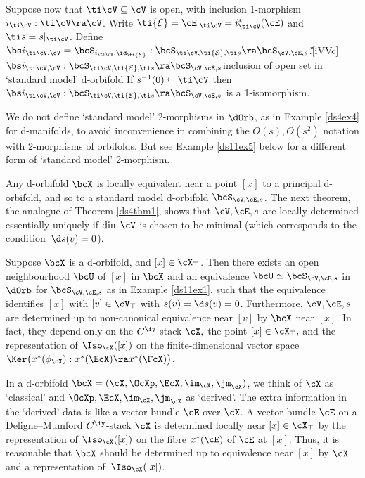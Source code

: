 \documentclass{article}
\begin{document}
\begin{ex}
Suppose now that $\ti\cV\subseteq\cV$ is open, with inclusion
1-morphism $i_{\smash{\ti\cV}}:\ti\cV\ra\cV$. Write $\ti{\cal
E}=\cE\vert_{\smash{\ti\cV}}= i_{\smash{\ti\cV}}^*(\cE)$ and $\ti
s=s\vert_{\smash{\ti\cV}}$. Define $\bs
i_{\smash{\ti\cV,\cV}}=\bcS_{i_{\smash{\ti\cV}},\id_{\ti{\cal E}}}:
\bcS_{\smash{\ti\cV,\ti{\cal E},\ti
s}}\ra\bcS_{\cV,\cE,s}$.\G[iVVc]{$\bs
i_{\smash{\ti\cV,\cV}}:\bcS_{\smash{\ti\cV,\ti{\cal E},\ti
s}}\ra\bcS_{\cV,\cE,s}$}{inclusion of open set in `standard model'
d-orbifold} If $s^{-1}(0)\subseteq\ti\cV$ then $\bs
i_{\smash{\ti\cV,\cV}}:\bcS_{\smash{\ti\cV,\ti{\cal E},\ti
s}}\ra\bcS_{\cV,\cE,s}$ is a 1-isomorphism.
\label{ds11ex2}
\end{ex}

We do not define `standard model' 2-morphisms in $\dOrb$, as in
Example \ref{ds4ex4} for d-manifolds, to avoid inconvenience in
combining the $O(s),O(s^2)$ notation with 2-morphisms of orbifolds.
But see Example \ref{ds11ex5} below for a different form of
`standard model' 2-morphism.

Any d-orbifold $\bcX$ is locally equivalent near a point $[x]$ to a
principal d-orbifold, and so to a standard model d-orbifold
$\bcS_{\cV,\cE,s}$. The next theorem, the analogue of Theorem
\ref{ds4thm1}, shows that $\cV,\cE,s$ are locally determined
essentially uniquely if $\dim\cV$ is chosen to be minimal (which
corresponds to the condition~$\d s(v)=0$).

\begin{thm} Suppose\/ $\bcX$ is a d-orbifold, and\/
$[x]\in\cX_\top$. Then there exists an open neighbourhood\/ $\bcU$
of\/ $[x]$ in $\bcX$ and an equivalence
$\bcU\simeq\bcS_{\cV,\cE,s}$ in $\dOrb$ for $\bcS_{\cV,\cE,s}$ as in
Example\/ {\rm\ref{ds11ex1},} such that the equivalence identifies
$[x]$ with $[v]\in\cV_\top$ with\/ $s(v)=\d s(v)=0$. Furthermore,
$\cV,\cE,s$ are determined up to non-canonical equivalence near
$[v]$ by $\bcX$ near $[x]$. In fact, they depend only on the
$C^\iy$-stack $\cX,$ the point\/ $[x]\in\cX_\top,$ and the
representation of\/ $\Iso_\cX([x])$ on the finite-dimensional vector
space\/~$\Ker\bigl(x^*(\phi_\cX):x^*(\EcX)\ra x^*(\FcX)\bigr)$.
\label{ds11thm1}
\end{thm}

In a d-orbifold $\bcX=(\cX,\OcXp,\EcX,\im_\cX,\jm_\cX)$, we think of
$\cX$ as `classical' and $\OcXp,\EcX,\im_\cX,\jm_\cX$ as `derived'.
The extra information in the `derived' data is like a vector bundle
$\cE$ over $\cX$. A vector bundle $\cE$ on a Deligne--Mumford
$C^\iy$-stack $\cX$ is determined locally near $[x]\in\cX_\top$ by
the representation of $\Iso_\cX([x])$ on the fibre $x^*(\cE)$ of
$\cE$ at $[x]$. Thus, it is reasonable that $\bcX$ should be
determined up to equivalence near $[x]$ by $\cX$ and a
representation of~$\Iso_\cX([x])$.
\end{document}
